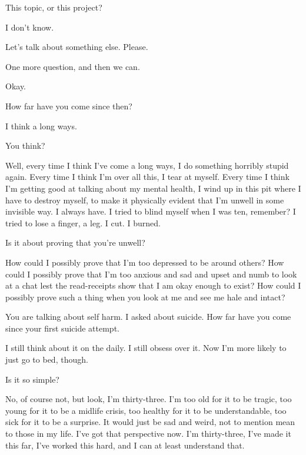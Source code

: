 \begin{ally}
This topic, or this project?
\end{ally}
I don't know.
\newpage

Let's talk about something else. Please.

\begin{ally}
One more question, and then we can.
\end{ally}
Okay.

\begin{ally}
How far have you come since then?
\end{ally}
I think a long ways.

\begin{ally}
You think?
\end{ally}
Well, every time I think I've come a long ways, I do something horribly stupid again. Every time I think I'm over all this, I tear at myself. Every time I think I'm getting good at talking about my mental health, I wind up in this pit where I have to destroy myself, to make it physically evident that I'm unwell in some invisible way. I always have. I tried to blind myself when I was ten, remember? I tried to lose a finger, a leg. I cut. I burned.

\begin{ally}
Is it about proving that you're unwell?
\end{ally}
How could I possibly prove that I'm too depressed to be around others? How could I possibly prove that I'm too anxious and sad and upset and numb to look at a chat lest the read-receipts show that I am okay enough to exist? How could I possibly prove such a thing when you look at me and see me hale and intact?

\begin{ally}
You are talking about self harm. I asked about suicide. How far have you come since your first suicide attempt.
\end{ally}
I still think about it on the daily. I still obsess over it. Now I'm more likely to just go to bed, though.

\begin{ally}
Is it so simple?
\end{ally}
No, of course not, but look, I'm thirty-three. I'm too old for it to be tragic, too young for it to be a midlife crisis, too healthy for it to be understandable, too sick for it to be a surprise. It would just be sad and weird, not to mention mean to those in my life. I've got that perspective now. I'm thirty-three, I've made it this far, I've worked this hard, and I can at least understand that.

